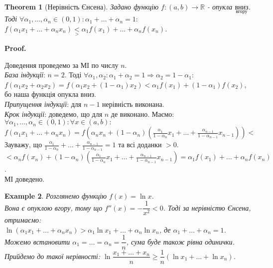 \documentclass[a4paper, 14pt]{article}
\makeatletter
\def\qed{$\blacksquare$}
\theoremstyle{theoremdd}
\newtheorem{theorem}{Theorem}[subsection]
\theoremstyle{theoremdd}
\theoremstyle{theoremdd}
\theoremstyle{theoremdd}
\newtheorem{example}[theorem]{Example}
\theoremstyle{theoremdd}
\theoremstyle{theoremdd}
\theoremstyle{theoremdd}
\theoremstyle{theoremdd}
\renewenvironment{proof}[1][Proof.\\]{\par
\pushQED{\hfill \qed}%
\normalfont \topsep6\p@\@plus6\p@\relax
\trivlist
\item\relax
{\bfseries
#1\@addpunct{.}}\hspace\labelsep\ignorespaces
}{%
\popQED\endtrivlist\@endpefalse
}
\makeatother
\begin{document}
\begin{theorem}[Нерівність Єнсена]
Задано функцію $f \colon (a,b) \to \mathbb{R}$ - опукла $\underset{\text{вгору}}{\textrm{вниз}}$. Тоді $\forall \alpha_1, \dots, \alpha_n \in (0,1): \displaystyle \alpha_1 + \dots + \alpha_n = 1:$\\
$\displaystyle f(\alpha_1 x_1 + \dots + \alpha_n x_n) \underset{>}{<} \alpha_1 f(x_1) + \dots + \alpha_n f(x_n)$.
\end{theorem}

\begin{proof}
Доведення проведемо за МІ по числу $n$.\\
\textit{База індукції}: $n = 2$. Тоді $\forall \alpha_1, \alpha_2: \alpha_1 + \alpha_2 = 1 \Rightarrow \alpha_2 = 1- \alpha_1:$\\
$f(\alpha_1 x_2 + \alpha_2 x_2) = f(\alpha_1 x_2 + (1-\alpha_1)x_2) < \alpha_1 f(x_1) + (1-\alpha_1)f(x_2)$, бо наша функція опукла вниз.\\
\textit{Припущення індукції}: для $n-1$ нерівність виконана. \\
\textit{Крок індукції}: доведемо, що для $n$ де виконано. Маємо:\\
$\forall \alpha_1,\dots,\alpha_n \in (0,1): \forall x \in (a,b):$\\
$f(\alpha_1 x_1 + \dots + \alpha_n x_n) = \displaystyle f\left(\alpha_n x_n + (1-\alpha_n)\left(\frac{\alpha_1}{1-\alpha_n}x_1 + \dots + \frac{\alpha_{n-1}}{1-\alpha_{n-1}}x_{n-1} \right)\right) \boxed{<}$\\
Зауважу, що $\displaystyle \frac{\alpha_1}{1-\alpha_n} + \dots + \frac{\alpha_{n-1}}{1-\alpha_{n-1}} = 1$ та всі доданки $>0$.\\
$\boxed{<} \displaystyle \alpha_n f(x_n) + (1-\alpha_n)\left(\frac{\alpha_1}{1-\alpha_n}x_1 + \dots + \frac{\alpha_{n-1}}{1-\alpha_{n-1}}x_{n-1} \right) = \alpha_1 f(x_1) + \dots + \alpha_n f(x_n)$.\\
МІ доведено.
\end{proof}

\begin{example}
Розглянемо функцію $f(x) = \ln x$.\\
Вона є опуклою вгору, тому що $f''(x) = -\dfrac{1}{x^2} < 0$. Тоді за нерівністю Єнсена, отримаємо:\\
$\ln(\alpha_1 x_1 + \dots + \alpha_n x_n) > \alpha_1 \ln x_1 + \dots + \alpha_n \ln x_n$, де $\alpha_1 + \dots + \alpha_n = 1$.\\
Можемо встановити $\alpha_1 = \dots = \alpha_n = \dfrac{1}{n}$, сума буде також рівна одинички. Прийдемо до такої нерівності: $\ln \dfrac{x_1+\dots+x_n}{n} \geq \dfrac{1}{n} \left( \ln x_1 + \dots + \ln x_n \right)$.
\end{example}
\end{document}
